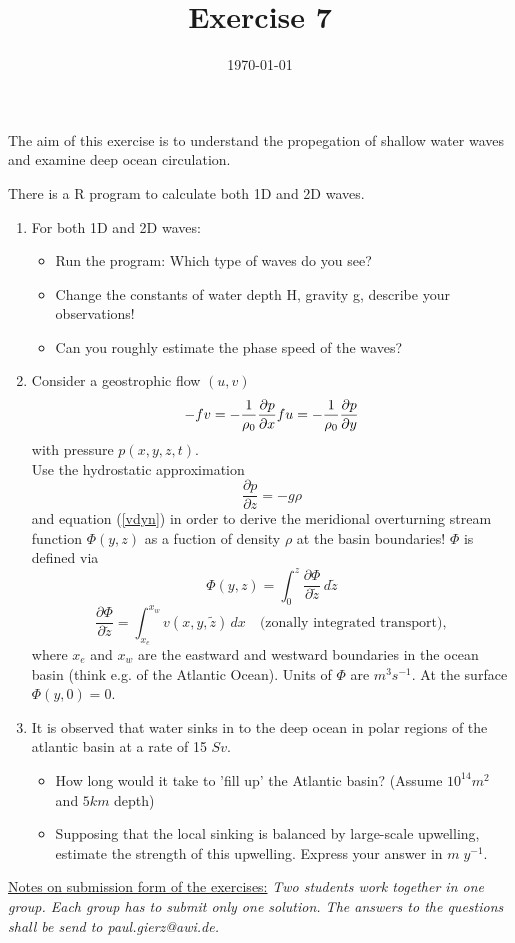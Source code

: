 \documentclass[a4paper,12pt]{article}
\title{Exercise 7}
\date{\today}
\begin{document}
\maketitle
\thispagestyle{fancy}

The aim of this exercise is to understand the propegation of shallow
water waves and examine deep ocean circulation.

There is a R program to calculate both 1D and 2D waves. 

\begin{enumerate}
\item For both 1D and 2D waves:
    \begin{itemize}
        \item Run the program: Which type of waves do you see?
        \item Change the constants of water depth H, gravity g, describe your observations!
        \item Can you roughly estimate the phase speed of the waves?
    \end{itemize}

\item Consider a geostrophic flow $( u,  v) $
\begin{equation}
-f  v = - \frac{1}{\rho_0} \frac{\partial  p}{\partial x} \label{vdyn} \\
f  u = - \frac{1}{\rho_0} \frac{\partial  p}{\partial y} 
\end{equation}
with pressure $ p (x,y,z,t)$. \\
Use the hydrostatic approximation 
\begin{equation}
 \frac{\partial  p}{\partial z} = -g \rho
 \end{equation}
 and equation (\ref{vdyn}) in order to derive the meridional overturning stream function $\Phi(y,z)$ as a fuction of density $\rho$ at the basin boundaries! 
$\Phi$ is defined via 
\begin{equation}
\Phi(y,z) = \int_{0}^{z} \frac{\partial  \Phi}{\partial \tilde z} \,d
\tilde z
\end{equation}
\begin{equation}
\frac{\partial  \Phi}{\partial \tilde z} = \int_{x_e}^{x_w} v(x,y,\tilde z) \, dx  \quad \mbox{(zonally integrated transport)}, 
\end{equation}
where $ x_e $ and $ x_w $ are the eastward and westward boundaries in
the ocean basin (think e.g. of the Atlantic Ocean). Units of $\Phi$
are $m^3 s^{-1}$. At the surface $\Phi(y,0)=0$.
\item
It is observed that water sinks in to the deep ocean in polar regions of the atlantic basin at a rate of 15 $Sv$.
\begin{itemize}
	\item How long would it take to 'fill up' the Atlantic basin?
          (Assume $10^{14}m^{2}$ and $5km$ depth)
	\item Supposing that the local sinking is balanced by
          large-scale upwelling, estimate the strength of this
          upwelling. Express your answer in $m\;y^{-1}.$
\end{itemize}
\end{enumerate}

\vfill
\underline{Notes on submission form of the exercises:}
 \textit{Two students work together in one group. Each group has to submit only one solution. The answers to the questions shall be send to paul.gierz@awi.de.}
\end{document}
